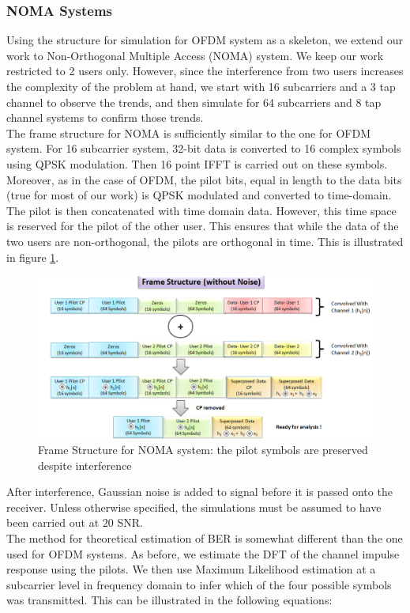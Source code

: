 \subsubsection{NOMA Systems}
Using the structure for simulation for OFDM system as a skeleton, we extend our work to Non-Orthogonal Multiple Access (NOMA) system. We keep our work restricted to 2 users only. However, since the interference from two users increases the complexity of the problem at hand, we start with 16 subcarriers and a 3 tap channel to observe the trends, and then simulate for 64 subcarriers and 8 tap channel systems to confirm those trends.\\
The frame structure for NOMA is sufficiently similar to the one for OFDM system. For 16 subcarrier system, 32-bit data is converted to 16 complex symbols using QPSK modulation. Then 16 point IFFT is carried out on these symbols. Moreover, as in the case of OFDM, the pilot bits, equal in length to the data bits (true for most of our work) is QPSK modulated and converted to time-domain. The pilot is then concatenated with time domain data. However, this time space is reserved for the pilot of the other user. This ensures that while the data of the two users are non-orthogonal, the pilots are orthogonal in time. This is illustrated in figure \ref{fig:comm_noma}.\\
\begin{figure}[htbp]
  \centering
  \includegraphics[width=\textwidth]{./Figures/comm_noma.png}
  \caption{Frame Structure for NOMA system: the pilot symbols are preserved despite interference}
  \label{fig:comm_noma}
\end{figure}
After interference, Gaussian noise is added to signal before it is passed onto the receiver. Unless otherwise specified, the simulations must be assumed to have been carried out at $20$ SNR. \\
The method for theoretical estimation of BER is somewhat different than the one used for OFDM systems. As before, we estimate the DFT of the channel impulse response using the pilots. We then use Maximum Likelihood estimation at a subcarrier level in frequency domain to infer which of the four possible symbols was transmitted. This can be illustrated in the following equations:\\
